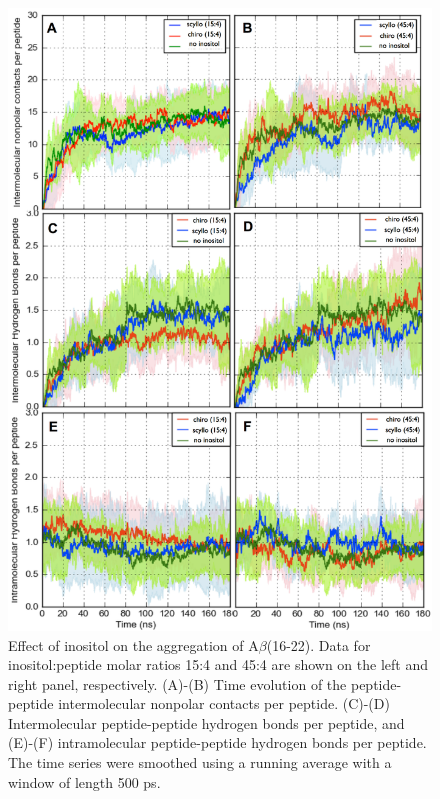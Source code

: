 \begin{figure}[ht]
\centering
\includegraphics[width=14cm]{figures/appendixA/inos2_figures_SI_disorderedContactTS.pdf}
\caption[Effect of inositol on the aggregation of A$\beta$(16-22)]{Effect of inositol on the aggregation of A$\beta$(16-22). Data for inositol:peptide molar ratios 15:4 and 45:4 are shown on the left and right panel, respectively. (A)-(B) Time evolution of the peptide-peptide intermolecular nonpolar contacts per peptide. (C)-(D) Intermolecular peptide-peptide hydrogen bonds per peptide, and (E)-(F) intramolecular peptide-peptide hydrogen bonds per peptide. The time series were smoothed using a running average with a window of length 500 ps.}
\label{fig:SI-disorderedContactsTS}
\end{figure}


